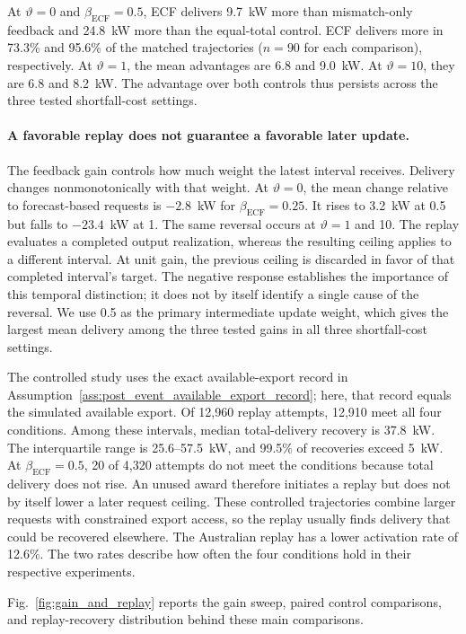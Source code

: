 \documentclass[twoside,twocolumn,9pt]{article}
\begin{document}
At $\vartheta=0$ and $\beta_{\mathrm{ECF}}=0.5$, ECF delivers 9.7~kW more than
mismatch-only feedback and 24.8~kW more than the equal-total control.
ECF delivers more in 73.3\% and 95.6\% of the matched trajectories
($n=90$ for each comparison),
respectively. At $\vartheta=1$, the mean advantages are 6.8 and 9.0~kW. At
$\vartheta=10$, they are 6.8 and 8.2~kW. The advantage over both controls thus
persists across the three tested shortfall-cost settings.

\paragraph{A favorable replay does not guarantee a favorable later update.}
The feedback gain controls how much weight the latest interval receives.
Delivery changes nonmonotonically with that weight. At $\vartheta=0$, the mean
change relative to forecast-based requests is $-2.8$~kW for
$\beta_{\mathrm{ECF}}=0.25$. It rises to 3.2~kW at 0.5 but falls to $-23.4$~kW
at 1. The same reversal occurs at
$\vartheta=1$ and 10. The replay evaluates a completed output realization,
whereas the resulting ceiling applies to a different interval. At unit gain,
the previous ceiling is discarded in favor of that completed interval's target.
The negative response establishes the importance of this temporal distinction;
it does not by itself identify a single cause of the reversal. We use 0.5 as
the primary intermediate update weight, which gives the largest mean delivery
among the three tested gains in all three shortfall-cost settings.

The controlled study uses the exact available-export record in
Assumption~\ref{ass:post_event_available_export_record}; here, that record equals the
simulated available export. Of 12,960 replay attempts, 12,910
meet all four conditions. Among these intervals, median total-delivery
recovery is 37.8~kW. The interquartile range is 25.6--57.5~kW, and 99.5\%
of recoveries exceed 5~kW. At $\beta_{\mathrm{ECF}}=0.5$, 20 of 4,320 attempts
do not meet the conditions because total delivery does not rise. An unused award
therefore initiates a replay but does not by itself lower a later request ceiling.
These controlled trajectories combine larger requests with constrained export
access, so the replay usually finds delivery that could be recovered elsewhere.
The Australian replay has a lower activation rate of 12.6\%. The two rates
describe how often the four conditions hold in their respective experiments.

Fig.~\ref{fig:gain_and_replay} reports the gain sweep, paired control
comparisons, and replay-recovery distribution behind these main comparisons.
\end{document}
